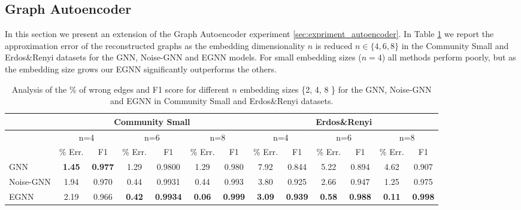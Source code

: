 \subsection{Graph Autoencoder}  \label{sec:appendix_graph_autoencoder}
In this section we present an extension of the Graph Autoencoder experiment \ref{sec:expriment_autoencoder}. In Table \ref{tab:appendix_graph_autoencoder} we report the approximation error of the reconstructed graphs as the embedding dimensionality $n$ is reduced $n \in \{4, 6, 8 \}$ in the Community Small and Erdos\&Renyi datasets for the GNN, Noise-GNN and EGNN models. For small embedding sizes ($n=4$) all methods perform poorly, but as the embedding size grows our EGNN significantly outperforms the others.



\begin{table}[]
\renewcommand{\arraystretch}{0.5}
\begin{center} \small
\begin{tabular}{l | cc | cc | cc | cc | cc | cc  } 
    \toprule
     & \multicolumn{6}{|c}{Community Small} &   \multicolumn{6}{|c}{Erdos\&Renyi}\\
     \midrule
     & \multicolumn{2}{|c|}{n=4} &  \multicolumn{2}{|c|}{n=6} & \multicolumn{2}{|c|}{n=8} &
      \multicolumn{2}{|c|}{n=4} &  \multicolumn{2}{|c|}{n=6} & \multicolumn{2}{|c}{n=8} \\
     \midrule
      & \% Err. & F1  & \% Err. & F1 & \% Err. & F1 & \% Err. & F1 & \% Err. & F1 & \% Err. & F1 \\
    \midrule
    GNN & \textbf{1.45} & \textbf{0.977} & 1.29 & 0.9800 & 1.29 & 0.980 & 7.92 & 0.844 & 5.22 & 0.894 & 4.62 & 0.907   \\
    Noise-GNN & 1.94 & 0.970 & 0.44 & 0.9931 & 0.44 & 0.993 & 3.80 & 0.925 & 2.66 & 0.947 & 1.25 & 0.975   \\
    EGNN & 2.19 & 0.966 & \textbf{0.42} & \textbf{0.9934} & \textbf{0.06} & \textbf{0.999} & \textbf{3.09} & \textbf{0.939} & \textbf{0.58} & \textbf{0.988} & \textbf{0.11} & \textbf{0.998}   \\
    \bottomrule
\end{tabular}
\caption{Analysis of the \% of wrong edges and F1 score for different $n$ embedding sizes \{2, 4, 8 \} for the GNN, Noise-GNN and EGNN in Community Small and Erdos\&Renyi datasets.}
\label{tab:appendix_graph_autoencoder} 
\end{center}
\end{table}

